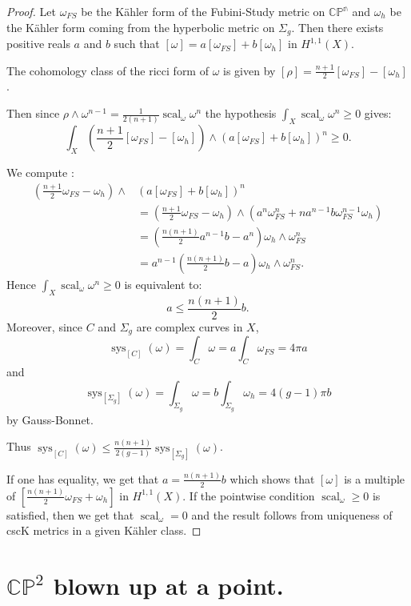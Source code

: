 \documentclass{amsart}
\numberwithin{equation}{section}
\theoremstyle{definition}
\DeclareMathOperator{\scal}{scal}
\DeclareMathOperator{\sys}{sys}
\begin{document}
\begin{proof}
    Let $\omega_{FS}$ be the K\"ahler form of the Fubini-Study metric on $\mathbb{CP^n}$ and $\omega_h$ be the K\"ahler form coming from the hyperbolic metric on $\Sigma_g$.
    Then there exists positive reals $a$ and $b$ such that $[\omega]=a[\omega_{FS}]+b[\omega_h]$ in $H^{1,1}(X)$.

    The cohomology class of the ricci form of $\omega$ is given by
    $[\rho]=\frac{n+1}{2}[\omega_{FS}]-[\omega_h]$.

    Then since $\rho\wedge\omega^{n-1}=\frac{1}{2(n+1)}\scal_\omega\omega^n$ the hypothesis $\int_X\scal_\omega\omega^n\geq 0$ gives:
    \[\int_X \left (\frac{n+1}{2}[\omega_{FS}]-[\omega_h]\right)\wedge \left(a[\omega_{FS}]+b[\omega_h]\right)^n\geq 0.\]

    We compute :
    \begin{align*}
        \left (\frac{n+1}{2}\omega_{FS}-\omega_h\right)\wedge & \left(a[\omega_{FS}]+b[\omega_h]\right)^n\\
        &=\left(\frac{n+1}{2}\omega_{FS}-\omega_h\right)\wedge(a^n\omega_{FS}^n+na^{n-1}b\omega_{FS}^{n-1}\omega_h)\\
        &=\left(\frac{n(n+1)}{2}a^{n-1}b-a^n\right)\omega_h\wedge\omega_{FS}^n\\
        &=a^{n-1}\left(\frac{n(n+1)}{2}b-a\right)\omega_h\wedge\omega_{FS}^n.
    \end{align*}
    Hence $\int_X\scal_{\omega}\omega^n\geq 0$ is equivalent to:
    \[a\leq\frac{n(n+1)}{2}b.\]
    Moreover, since $C$ and $\Sigma_g$ are complex curves in $X$, \[\sys_{[C]}(\omega)=\int_C\omega=a\int_C\omega_{FS}=4\pi a\]
    and
    \[\sys_{[\Sigma_g]}(\omega)=\int_{\Sigma_g}\omega=b\int_{\Sigma_g}\omega_{h}=4(g-1)\pi b\] by Gauss-Bonnet.

    Thus $\sys_{[C]}(\omega)\leq\frac{n(n+1)}{2(g-1)}\sys_{[\Sigma_g]}(\omega)$.

    If one has equality, we get that $a=\frac{n(n+1)}{2}b$ which shows that $[\omega]$ is a multiple of $[\frac{n(n+1)}{2}\omega_{FS}+\omega_h]$ in $H^{1,1}(X)$. If the pointwise condition $\scal_\omega\geq 0$ is satisfied, then we get that $\scal_\omega=0$ and the result follows from uniqueness of cscK metrics in a given K\"ahler class.
\end{proof}

\section{$\mathbb{CP}^2$ blown up at a point.}
\end{document}
